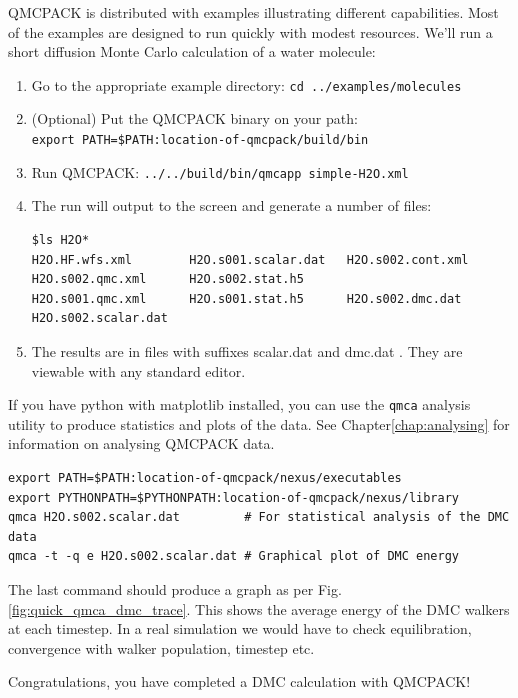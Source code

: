 QMCPACK is distributed with examples illustrating different
capabilities. Most of the examples are designed to run quickly with
modest resources. We'll run a short diffusion Monte Carlo calculation
of a water molecule:

\begin{enumerate}
\item Go to the appropriate example directory: \texttt{cd
    ../examples/molecules}
\item (Optional) Put the QMCPACK binary on your path:\\ \texttt{export PATH=\$PATH:location-of-qmcpack/build/bin}
\item Run QMCPACK: \texttt{../../build/bin/qmcapp simple-H2O.xml}
\item The run will output to the screen and generate a number of files:
\begin{verbatim}
$ls H2O*
H2O.HF.wfs.xml        H2O.s001.scalar.dat   H2O.s002.cont.xml     H2O.s002.qmc.xml      H2O.s002.stat.h5
H2O.s001.qmc.xml      H2O.s001.stat.h5      H2O.s002.dmc.dat      H2O.s002.scalar.dat
\end{verbatim}
\item The results are in files with suffixes scalar.dat and dmc.dat . They are viewable with any standard editor.
\end{enumerate}

If you have python with matplotlib installed, you can use the
\texttt{qmca} analysis utility to produce statistics and plots of the
data. See Chapter\ref{chap:analysing} for information on analysing
QMCPACK data.
\begin{verbatim}
export PATH=$PATH:location-of-qmcpack/nexus/executables 
export PYTHONPATH=$PYTHONPATH:location-of-qmcpack/nexus/library
qmca H2O.s002.scalar.dat         # For statistical analysis of the DMC data
qmca -t -q e H2O.s002.scalar.dat # Graphical plot of DMC energy
\end{verbatim}

The last command should produce a graph as per
Fig. \ref{fig:quick_qmca_dmc_trace}. This shows the average energy of
the DMC walkers at each timestep. In a real simulation we would have
to check equilibration, convergence with walker population, timestep etc.

Congratulations, you have completed a DMC calculation with QMCPACK!

